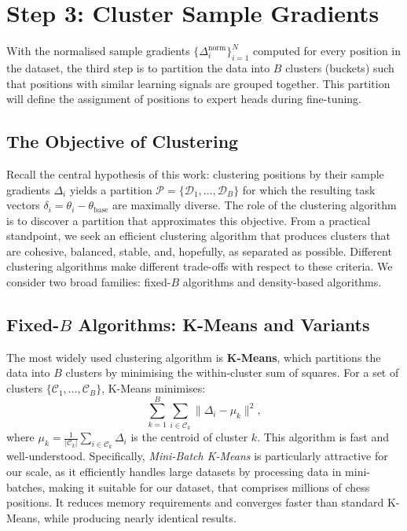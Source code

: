 \section{Step 3: Cluster Sample Gradients}\label{sec:step-cluster}

With the normalised sample gradients \(\{\Delta_i^{\mathrm{norm}}\}_{i=1}^N\) computed for every position in the dataset, the third step is to partition the data into \(B\) clusters (buckets) such that positions with similar learning signals are grouped together. This partition will define the assignment of positions to expert heads during fine-tuning.

\subsection{The Objective of Clustering}\label{sec:cluster-obj}

Recall the central hypothesis of this work: clustering positions by their sample gradients \(\Delta_i\) yields a partition \(\mathcal{P} = \{\mathcal{D}_1, \dots, \mathcal{D}_B\}\) for which the resulting task vectors \(\delta_i = \theta_i - \theta_{\mathrm{base}}\) are maximally diverse. The role of the clustering algorithm is to discover a partition that approximates this objective. From a practical standpoint, we seek an efficient clustering algorithm that produces clusters that are cohesive, balanced, stable, and, hopefully, as separated as possible. Different clustering algorithms make different trade-offs with respect to these criteria. We consider two broad families: fixed-\(B\) algorithms and density-based algorithms.

\subsection{Fixed-\texorpdfstring{\(B\)}{B} Algorithms: K-Means and Variants}\label{sec:kmeans}

The most widely used clustering algorithm is \textbf{K-Means}, which partitions the data into \(B\) clusters by minimising the within-cluster sum of squares. For a set of clusters \(\{\mathcal{C}_1, \dots, \mathcal{C}_B\}\), K-Means minimises:
\[
\sum_{k=1}^B \sum_{i \in \mathcal{C}_k} \lVert\Delta_i - \mu_k\rVert^2,
\]
where \(\mu_k = \frac{1}{|\mathcal{C}_k|} \sum_{i \in \mathcal{C}_k} \Delta_i\) is the centroid of cluster \(k\). This algorithm is fast and well-understood. Specifically, \emph{Mini-Batch K-Means} is particularly attractive for our scale, as it efficiently handles large datasets by processing data in mini-batches, making it suitable for our dataset, that comprises millions of chess positions. It reduces memory requirements and converges faster than standard K-Means, while producing nearly identical results.

